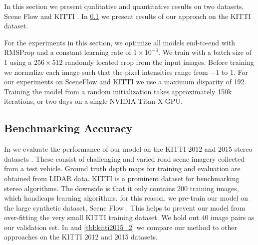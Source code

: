 In this section we present qualitative and quantitative results on two datasets, Scene Flow \citep{MIFDB16} and KITTI \citep{Geiger2012CVPR,Menze2015CVPR}.
In \cref{sec:benchmark_stereo} we present results of our approach on the KITTI dataset.

For the experiments in this section, we optimize all models end-to-end with RMSProp \citep{tieleman2012lecture} and a constant learning rate of $1 \times 10^{-3}$. We train with a batch size of 1 using a $256\times512$ randomly located crop from the input images. Before training we normalize each image such that the pixel intensities range from $-1$ to $1$. For our experiments on SceneFlow and KITTI we use a maximum disparity of 192. Training the model from a random initialization takes approximately 150k iterations, or two days on a single NVIDIA Titan-X GPU. 

\subsection{Benchmarking Accuracy}
\label{sec:benchmark_stereo}

In  we evaluate the performance of our model on the KITTI 2012 and 2015 stereo datasets \citep{Geiger2012CVPR,Menze2015CVPR}. These consist of challenging and varied road scene imagery collected from a test vehicle. Ground truth depth maps for training and evaluation are obtained from LIDAR data. KITTI is a prominent dataset for benchmarking stereo algorithms. The downside is that it only contains $200$ training images, which handicaps learning algorithms. for this reason, we pre-train our model on the large synthetic dataset, Scene Flow \citep{MIFDB16}. This helps to prevent our model from over-fitting the very small KITTI training dataset. We hold out 40 image pairs as our validation set. In  and \ref{tbl:kitti2015_2} we compare our method to other approaches on the KITTI 2012 and 2015 datasets.%

